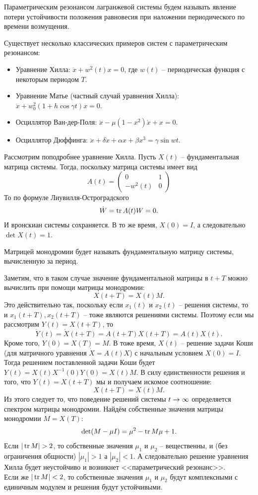 \begin{definition}
    Параметрическим резонансом лагранжевой системы будем называть явление потери устойчивости положения равновесия при наложении периодического по времени возмущения.
\end{definition}
Существует несколько классических примеров систем с параметрическим резонансом:
\begin{itemize}
    \item Уравнение Хилла: $\ddot{x} + w^2(t) x = 0$, где $w(t)$ -- периодическая функция с некоторым периодом $T$.
    \item Уравнение Матье (частный случай уравнения Хилла): $\ddot{x} + w_0^2(1 + h \cos \gamma t)x = 0$.
    \item Осциллятор Ван-дер-Поля: $\ddot{x} - \mu(1 - x^2)\dot{x} + x = 0$.
    \item Осциллятор Дюффинга: $\ddot{x} + \delta \dot{x} + \alpha x + \beta x^3 = \gamma \sin w t$.
\end{itemize}
Рассмотрим поподробнее уравнение Хилла.
Пусть $X(t)$ -- фундаментальная матрица системы.
Тогда, поскольку матрица системы имеет вид
\[
    A(t) =
    \begin{pmatrix*}
        0 & 1 \\
        -w^2(t) & 0
    \end{pmatrix*}
\]
То по формуле Лиувилля-Остроградского
\[
    \dot{W} = \operatorname{tr} A(t) W = 0.
\]
И вронскиан системы сохраняется.
В то же время, $X(0) = I$, а следовательно $\det X(t) = 1$.
\begin{definition}
    Матрицей монодромии будет называть фундаментальную матрицу системы, вычисленную за период.
\end{definition}
Заметим, что в таком случае значение фундаментальной матрицы в $t + T$ можно вычислить при помощи матрицы монодромии:
\[
    X(t + T) = X(t)M.
\]
Это действительно так, поскольку если $x_1(t)$ и $x_2(t)$ -- решения системы, то и $x_1(t + T), x_2(t + T)$ -- тоже являются решениями системы.
Поэтому если мы рассмотрим $Y(t) = X(t + T)$, то
\[
    \dot{Y}(t) = \dot{X}(t + T) = A(t + T)X(t + T) = A(t)X(t).
\]
Кроме того, $Y(0) = X(T) = M$.
В тоже время, $X(t)$ -- решение задачи Коши (для матричного уравнения $\dot{X} = A(t)X$) с начальным условием $X(0) = I$.
Тогда решением поставленной задачи Коши будет $Y(t) = X(t)X^{-1}(0)Y(0) = X(t)M$.
В силу единственности решения и того, что $Y(t) = X(t + T)$ мы и получаем искомое соотношение:
\[
    X(t + T) = X(t)M.
\]
Из этого следует то, что поведение решений системы  $t \rightarrow \infty$ определяется спектром матрицы монодромии.
Найдём собственные значения матрицы монодромии $M = X(T)$:
\[
    \det(M - \mu I) = \mu^2 - \operatorname{tr} M \mu + 1.
\]
Если $|\operatorname{tr} M| > 2$, то собственные значения $\mu_1$ и $\mu_2$ -- вещественны, и (без ограничения общности) $|\mu_1| > 1$ а $|\mu_2| < 1$.
А следовательно решение уравнения Хилла будет неустойчиво и возникнет <<параметрический резонанс>>. \\
Если же $|\operatorname{tr} M| < 2$, то собственные значения $\mu_1$ и $\mu_2$ будут комплексными с единичным модулем и решения будут устойчивыми.

